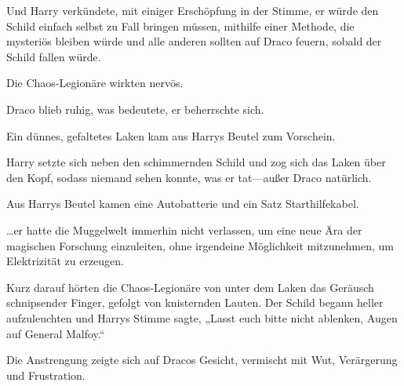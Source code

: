 Und Harry verkündete, mit einiger Erschöpfung in der Stimme, er würde den Schild einfach selbst zu Fall bringen müssen, mithilfe einer Methode, die mysteriös bleiben würde und alle anderen sollten auf Draco feuern, sobald der Schild fallen würde.

Die Chaos-Legionäre wirkten nervös.

Draco blieb ruhig, was bedeutete, er beherrschte sich.

Ein dünnes, gefaltetes Laken kam aus Harrys Beutel zum Vorschein.

Harry setzte sich neben den schimmernden Schild und zog sich das Laken über den Kopf, sodass niemand sehen konnte, was er tat—außer Draco natürlich.

Aus Harrys Beutel kamen eine Autobatterie und ein Satz Starthilfekabel.

…er hatte die Muggelwelt immerhin nicht verlassen, um eine neue Ära der magischen Forschung einzuleiten, ohne irgendeine Möglichkeit mitzunehmen, um Elektrizität zu erzeugen.

Kurz darauf hörten die Chaos-Legionäre von unter dem Laken das Geräusch schnipsender Finger, gefolgt von knisternden Lauten. Der Schild begann heller aufzuleuchten und Harrys Stimme sagte, „Lasst euch bitte nicht ablenken, Augen auf General Malfoy.“

Die Anstrengung zeigte sich auf Dracos Gesicht, vermischt mit Wut, Verärgerung und Frustration.

